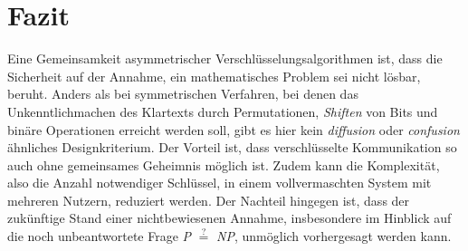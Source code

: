 \section{Fazit}


Eine Gemeinsamkeit asymmetrischer Verschlüsselungsalgorithmen ist, dass die Sicherheit auf der Annahme, ein mathematisches Problem sei nicht  lösbar, beruht. Anders als bei symmetrischen Verfahren, bei denen das Unkenntlichmachen des Klartexts durch Permutationen, \textit{Shiften} von Bits und binäre Operationen erreicht werden soll, gibt es hier kein \textit{diffusion} oder \textit{confusion} ähnliches Designkriterium. Der Vorteil ist, dass verschlüsselte Kommunikation so auch ohne gemeinsames Geheimnis möglich ist. Zudem kann die Komplexität, also die Anzahl notwendiger Schlüssel, in einem vollvermaschten System mit mehreren Nutzern, reduziert werden. Der Nachteil hingegen ist, dass der zukünftige Stand einer nichtbewiesenen Annahme, insbesondere im Hinblick auf die noch unbeantwortete Frage \textit{P} $\stackrel{?}{=}$ \textit{NP}, unmöglich vorhergesagt werden kann.

